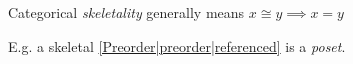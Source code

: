 
Categorical \emph{skeletality} generally means $x \cong y \implies x = y$

E.g. a skeletal \ref{Preorder|preorder|referenced} is a \emph{poset}.